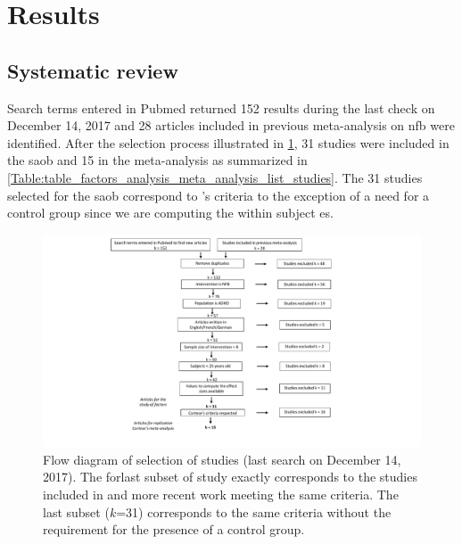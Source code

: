 


\section{Results}

\subsection{Systematic review}

Search terms entered in Pubmed returned 152 results during the last check on December 14, 2017 and 28 articles included in previous
meta-analysis on \gls{nfb} were identified. After the selection process illustrated in \cref{Figure:systematic_review_workflow}, 
31 studies were included in the \gls{saob} and 15 in the meta-analysis as summarized in \cref{Table:table_factors_analysis_meta_analysis_list_studies}.
The 31 studies selected for the \gls{saob} correspond to \citeauthor{Cortese2016}'s criteria to the exception of a need for a control group since 
we are computing the within subject \gls{es}.  

\begin{figure}[h!]
  \centering
  \includegraphics[width=1.0\linewidth]{figures/meta_review_factors_analysis_how_studies_are_included_no_colors_2-columns_fitting_ima}
  \caption{Flow diagram of selection of studies (last search on December 14, 2017). The forlast subset of study exactly corresponds to the 
	studies included in \citet{Cortese2016} and more recent work meeting the same criteria. 
	The last subset ($k$=31) corresponds to the same criteria without the requirement for the presence of a control group.}
  \label{Figure:systematic_review_workflow}
\end{figure}

